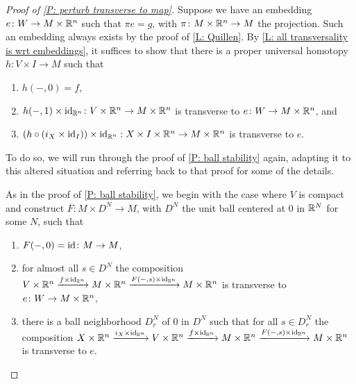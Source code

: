 \begin{proof}[Proof of \cref{P: perturb transverse to map}]
	Suppose we have an embedding $e \colon W \to M \times \mathbb{R}^n$ such that $\pi e = g$, with $\pi \colon M \times \mathbb{R}^n \to M$ the projection.
	Such an embedding always exists by the proof of \cref{L: Quillen}.
	By \cref{L: all transversality is wrt embeddings}, it suffices to show that there is a proper universal homotopy $h \colon V \times I \to M$ such that
	\begin{enumerate}
		\item $h(-,0) = f$,
		\item $h(-,1) \times \mathrm{id}_{\mathbb{R}^n} \colon V \times \mathbb{R}^n \to M \times \mathbb{R}^n$ is transverse to $e \colon W \to M \times \mathbb{R}^n$, and
		\item $(h \circ (i_{X} \times \mathrm{id}_I)) \times \mathrm{id}_{\mathbb{R}^n}: X \times I \times \mathbb{R}^n \to M \times \mathbb{R}^n$ is transverse to $e$.
	\end{enumerate}
	To do so, we will run through the proof of \cref{P: ball stability} again, adapting it to this altered situation and referring back to that proof for some of the details.

	\begin{comment}
		\red{Note to Dev and Anibal: I know this is a bit redundant and \cref{P: ball stability} is arguably a special case with $n = 0$ (though there are a few other differences), but the proof of \cref{P: ball stability} is already very complicated so I didn't want to just do this more general version earlier.}
	\end{comment}

	As in the proof of \cref{P: ball stability}, we begin with the case where $V$ is compact and construct $F \colon M \times D^N \to M$, with $D^N$ the unit ball centered at $0$ in $\mathbb{R}^N$ for some $N$, such that

	\begin{enumerate}
		\item $F(-,0) = \mathrm{id} \colon M \to M$,
		\item for almost all $s \in D^N$ the composition $V \times \mathbb{R}^n \xrightarrow{f \times \mathrm{id}_{\mathbb{R}^n}} M \times \mathbb{R}^n \xrightarrow{F(-,s) \times \mathrm{id}_{\mathbb{R}^n}}M \times \mathbb{R}^n$ is transverse to $e \colon W \to M \times \mathbb{R}^n$,

		\item there is a ball neighborhood $D_r^N$ of $0$ in $D^N$ such that for all $s \in D_r^N$ the composition $X \times \mathbb{R}^n \xrightarrow{i_{X} \times \mathrm{id}_{\mathbb{R}^n}} V \times \mathbb{R}^n \xrightarrow{f \times \mathrm{id}_{\mathbb{R}^n}} M \times \mathbb{R}^n \xrightarrow{F(-,s) \times \mathrm{id}_{\mathbb{R}^n}}M \times \mathbb{R}^n$ is transverse to $e$.
	\end{enumerate}


\end{proof}
